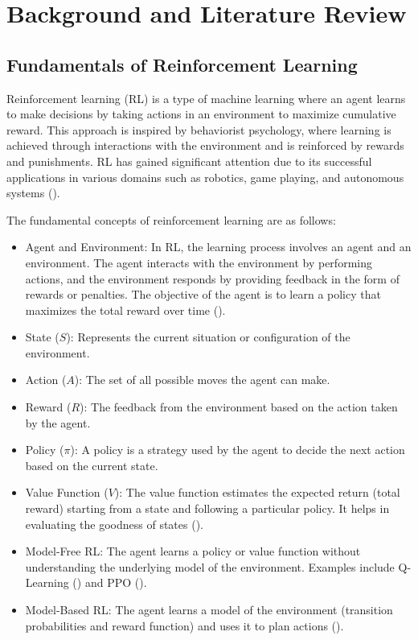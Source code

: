 \chapter{Background and Literature Review}

\section{Fundamentals of Reinforcement Learning}

Reinforcement learning (RL) is a type of machine learning where an agent learns to make decisions by taking actions in an environment to maximize cumulative reward. This approach is inspired by behaviorist psychology, where learning is achieved through interactions with the environment and is reinforced by rewards and punishments. RL has gained significant attention due to its successful applications in various domains such as robotics, game playing, and autonomous systems (\cite{sutton_reinforcement_2018}).

The fundamental concepts of reinforcement learning are as follows:
\begin{itemize}
    \item Agent and Environment: In RL, the learning process involves an agent and an environment. The agent interacts with the environment by performing actions, and the environment responds by providing feedback in the form of rewards or penalties. The objective of the agent is to learn a policy that maximizes the total reward over time (\cite{sutton_reinforcement_2018}).
    \item State ($S$): Represents the current situation or configuration of the environment.
    \item Action ($A$): The set of all possible moves the agent can make.
    \item Reward ($R$): The feedback from the environment based on the action taken by the agent.
    \item Policy ($\pi$): A policy is a strategy used by the agent to decide the next action based on the current state.
    \item Value Function ($V$): The value function estimates the expected return (total reward) starting from a state and following a particular policy. It helps in evaluating the goodness of states (\cite{szepesvari_algorithms_2022}).
    \item Model-Free RL: The agent learns a policy or value function without understanding the underlying model of the environment. Examples include Q-Learning (\cite{watkins_q-learning_1992}) and PPO (\cite{pan_policy_2018}).
    \item Model-Based RL: The agent learns a model of the environment (transition probabilities and reward function) and uses it to plan actions (\cite{kaelbling_reinforcement_1996}).
\end{itemize}

